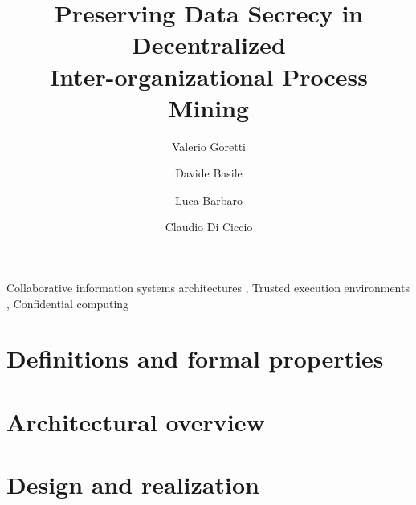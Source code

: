 \documentclass[preprint,review,12pt]{elsarticle}
\begin{document}
\begin{frontmatter}


\title{Preserving Data Secrecy in Decentralized \\ Inter-organizational Process Mining}

\author[a1]{Valerio Goretti}
\author[a1]{Davide Basile}
\author[a1]{Luca Barbaro}
\author[a2]{Claudio Di Ciccio}




\begin{abstract}
 
\end{abstract}




\begin{keyword}
Collaborative information systems architectures \sep%
 Trusted execution environments \sep%
 Confidential computing
\end{keyword}

\end{frontmatter}

\linenumbers






\section{Definitions and formal properties}\label{sec:formal}

\section{Architectural overview}\label{sec:design}


\section{Design and realization}\label{sec:realization}








 

\end{document}

